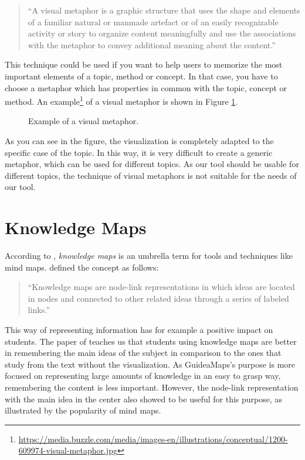 \begin{quote}
``A visual metaphor is a graphic structure that uses the shape and elements of a familiar natural or manmade artefact or of an easily recognizable activity or story to organize content meaningfully and use the associations with the metaphor to convey additional meaning about the content.'' \hfill \citep{eppler-2006}
\end{quote}

This technique could be used if you want to help users to memorize the most important elements of a topic, method or concept. In that case, you have to choose a metaphor which has properties in common with the topic, concept or method. \citep{eppler-2006} An example\footnote{\url{https://media.buzzle.com/media/images-en/illustrations/conceptual/1200-609974-visual-metaphor.jpg}} of a visual metaphor is shown in Figure \ref{fig:visual-metaphor}.

\begin{figure}[H]
	\centering
	\caption{Example of a visual metaphor.}
	\label{fig:visual-metaphor}
\end{figure}

As you can see in the figure, the visualization is completely adapted to the specific case of the topic. In this way, it is very difficult to create a generic metaphor, which can be used for different topics. As our tool should be usable for different topics, the technique of visual metaphors is not suitable for the needs of our tool.


\section{Knowledge Maps}
According to \cite{knowledgemapsbalaid}, \textit{knowledge maps} is an umbrella term for tools and techniques like mind maps. \cite{knowledgemapsodonnell} defined the concept as follows:

\begin{quote}
``Knowledge maps are node-link representations in which ideas are located in nodes and connected to other related ideas through a series of labeled links.'' \hfill 
\end{quote}

This way of representing information has for example a positive impact on students. The paper of \cite{knowledgemapsodonnell} teaches us that students using knowledge maps are better in remembering the main ideas of the subject in comparison to the ones that study from the text without the visualization. As GuideaMaps's purpose is more focused on representing large amounts of knowledge in an easy to grasp way, remembering the content is less important. However, the node-link representation with the main idea in the center also showed to be useful for this purpose, as illustrated by the popularity of mind maps.\\

